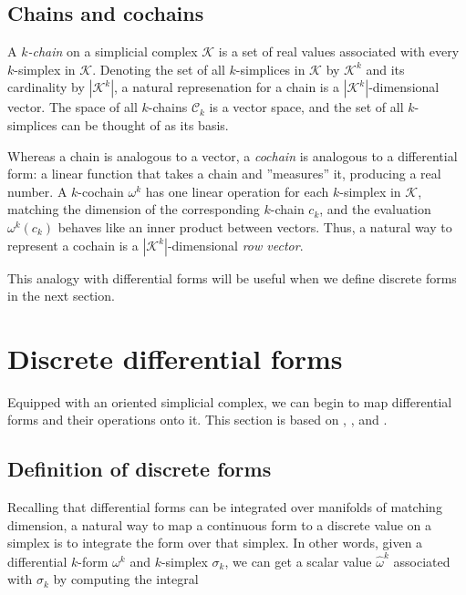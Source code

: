 \documentclass[utf8,english]{gradu3}
\begin{document}
\subsection{Chains and cochains}\label{sec:chains}

A \textit{$k$-chain} on a simplicial complex $\mathcal{K}$
is a set of real values associated with every $k$-simplex in $\mathcal{K}$.
Denoting the set of all $k$-simplices in $\mathcal{K}$ by $\mathcal{K}^k$
and its cardinality by $|\mathcal{K}^k|$,
a natural represenation for a chain is a $|\mathcal{K}^k|$-dimensional vector.
The space of all $k$-chains $\mathcal{C}_k$ is a vector space,
and the set of all $k$-simplices can be thought of as its basis.

Whereas a chain is analogous to a vector,
a \textit{cochain} is analogous to a differential form:
a linear function that takes a chain and ''measures'' it,
producing a real number.
A $k$-cochain $\omega^k$ has one linear operation for each $k$-simplex in $\mathcal{K}$,
matching the dimension of the corresponding $k$-chain $c_k$,
and the evaluation $\omega^k(c_k)$ behaves like an inner product between vectors.
Thus, a natural way to represent a cochain is a $|\mathcal{K}^k|$-dimensional \textit{row vector}.

This analogy with differential forms will be useful
when we define discrete forms in the next section.


\section{Discrete differential forms}

Equipped with an oriented simplicial complex,
we can begin to map differential forms and their operations onto it.
This section is based on \parencite{desbrun_discrete_2006},
\parencite{crane_digital_2013}, and \parencite{blair_perot_differential_2014}.


\subsection{Definition of discrete forms}\label{sec:discrete_forms}

Recalling that differential forms can be integrated
over manifolds of matching dimension,
a natural way to map a continuous form to a discrete value on a simplex
is to integrate the form over that simplex.
In other words, given a differential $k$-form $\omega^k$
and $k$-simplex $\sigma_k$, we can get a scalar value $\widehat{\omega}^k$
associated with $\sigma_k$ by computing the integral
\end{document}
